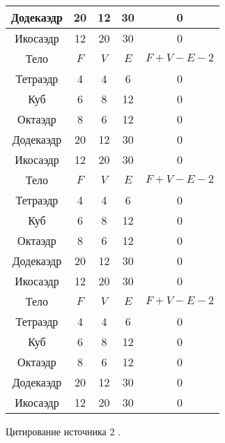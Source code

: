 \begin{longtable}[H]{|c|c|c|c|c|}
    Додекаэдр & 20  & 12   & 30  & 0         \\ \hline
    Икосаэдр  & 12  & 20   & 30  & 0         \\ \hline
    Тело      & $F$ & $V$  & $E$ & $F+V-E-2$ \\ \hline
    Тетраэдр  & 4   & 4    & 6   & 0         \\ \hhline{~-~-~}
    Куб       & 6   & 8    & 12  & 0         \\ \hhline{--~~~}
    Октаэдр   & 8   & 6    & 12  & 0         \\ \hhline{-----}
    Додекаэдр & 20  & 12   & 30  & 0         \\ \hline
    Икосаэдр  & 12  & 20   & 30  & 0         \\ \hline
    Тело      & $F$ & $V$  & $E$ & $F+V-E-2$ \\ \hline
    Тетраэдр  & 4   & 4    & 6   & 0         \\ \hhline{~-~-~}
    Куб       & 6   & 8    & 12  & 0         \\ \hhline{--~~~}
    Октаэдр   & 8   & 6    & 12  & 0         \\ \hhline{-----}
    Додекаэдр & 20  & 12   & 30  & 0         \\ \hline
    Икосаэдр  & 12  & 20   & 30  & 0         \\ \hline
    Тело      & $F$ & $V$  & $E$ & $F+V-E-2$ \\ \hline
    Тетраэдр  & 4   & 4    & 6   & 0         \\ \hhline{~-~-~}
    Куб       & 6   & 8    & 12  & 0         \\ \hhline{--~~~}
    Октаэдр   & 8   & 6    & 12  & 0         \\ \hhline{-----}
    Додекаэдр & 20  & 12   & 30  & 0         \\ \hline
    Икосаэдр  & 12  & 20   & 30  & 0         \\ \hline
\end{longtable}


\lipsum[1]

Цитирование источника 2 \cite{Article3}.
